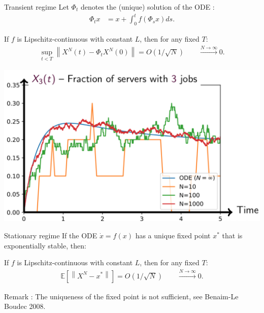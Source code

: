 \documentclass{beamer}
\newcommand\mpage[2]{%
  \begin{minipage}{#1\linewidth}%
    #2%
  \end{minipage}%
}
\newcommand\esp[1]{\mathbb{E}\left[#1\right]}
\newcommand\norm[1]{\left\|#1\right\|}
\begin{document}
\begin{frame}{Transient regime}
  Let $\Phi_t$ denotes the (unique) solution of the ODE : 
  \begin{align*}
    \Phi_tx &= x + \int_0^tf(\Phi_sx)ds.
  \end{align*}\pause 
  
  \begin{theorem}[Kurtz 70s]
    If $f$ is Lipschitz-continuous with constant $L$, then for any
    fixed $T$: 
    \begin{align*}
      \sup_{t<T}\norm{X^N(t) - \Phi_t X^N(0)} = O(1/\sqrt{N}) \qquad \xrightarrow{N\to\infty}0.
    \end{align*}
  \end{theorem}

  \begin{center}
    \mpage{.5}{\includegraphics[width=\linewidth]{clt}}
  \end{center}

  
\end{frame}

\begin{frame}{Stationary regime}
  If the ODE $\dot{x}=f(x)$ has a unique fixed point $x^*$ that is
  exponentially stable, then:\bigskip
  \begin{theorem}[Ying 2016]
    If $f$ is Lipschitz-continuous with constant $L$, then for any
    fixed $T$: 
    \begin{align*}
      \esp{\norm{X^N - x^*}} = O(1/\sqrt{N}) \qquad \xrightarrow{N\to\infty}0.
    \end{align*}    
  \end{theorem}

  \bigskip Remark : The uniqueness of the fixed point is not
  sufficient, see Benaim-Le Boudec 2008.
\end{frame}
\end{document}
